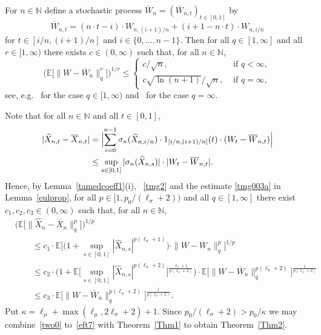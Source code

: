 \documentclass[11pt]{amsart}
\newcommand{\N}{{\mathbb N}}
\newcommand{\EE}{{\mathbb E}}
\newcommand{\eul}{{\widehat X}}
\newcommand{\ind}{1}
\theoremstyle{plain}
\theoremstyle{definition}
\begin{document}
For
$n\in\N$
define a stochastic process
$\overline W_n = (\overline W_{n,t})_{t\in[0,1]}$ by
\[
\overline W_{n,t} = (n\cdot t-i)\cdot W_{n,(i+1)/n} + (i+1-n\cdot t)\cdot  W_{n,i/n}
\]
for $t\in [i/n,(i+1)/n]$
and $i\in\{0,\ldots,n-1\}$.
Then for all  $q\in [1,\infty]$ and all $r\in [1,\infty)$
there exists $c\in (0,\infty)$ such that, for all $n\in\N$,
\begin{equation}\label{two01}
	\bigl(\EE\bigl[\|W-\overline W_n\|_q^r\bigr]\bigr)^{1/r}\leq \begin{cases}
		c/\sqrt n, & \text{ if }q < \infty,\\ c\sqrt{\ln (n+1)}/\sqrt{n}, & \text{ if }q = \infty,
	\end{cases}
\end{equation}
see, e.g.~\cite{Speckman79} for the case $q\in[1, \infty)$ and~\cite{Faure92} for the case $q=\infty$.

Note that for all $n\in\N$ and all $t\in[0,1]$,
\begin{align*}
	|\eul_{n,t} - \overline X_{n,t}| & =
	\Bigl|\sum_{i=0}^{n-1}\sigma_n(\eul_{n,i/n})\cdot \ind_{[i/n,(i+1)/n]}(t)\cdot (W_t- \overline W_{n,t})\Bigr|\\
	& \le \sup_{s\in[0,1]} |\sigma_n(\eul_{n,s})|\cdot |W_t-\overline W_{n,t}|.
\end{align*}
Hence, by Lemma~\ref{tamedcoeff1}(i), ~\eqref{tmg2} and the estimate \eqref{tmg003a} in Lemma~\ref{eulprop},  for all $p\in [1,p_0/(\ell_\sigma+2))$ and all $q\in [1,\infty]$  there exist $c_1,c_2,c_3\in (0,\infty)$ such that, for all $n\in\N$,
\begin{equation}\label{eft7}
\begin{aligned}
	&\bigl(\EE\bigl[\|\eul_n-\overline X_n\|_q^p\bigr]\bigr)^{1/p}\\
	 & \qquad\le c_1\cdot \EE\bigl[\bigl(1+\sup_{s\in[0,1]}|\eul_{n,s}|^{p(\ell_\sigma +1)}\bigr)\cdot \|W-\overline W_n\|_q^{p}\bigr]^{1/{p}}\\
		&\qquad\le c_2 \cdot \bigl(1 + \EE\bigl[\sup_{s\in[0,1]}|\eul_{n,s}|^{p(\ell_\sigma +2)}\bigr]^{\frac{\ell_\sigma+1}{p(\ell_\sigma+2)}}\bigr)\cdot \EE\bigl[ \|W-\overline W_n\|_q^{p(\ell_\sigma+2)} \bigr]^{\frac{1}{p(\ell_\sigma+2)}}\\
	&\qquad\le c_3\cdot \EE\bigl[ \|W-\overline W_n\|_q^{p(\ell_\sigma+2)} \bigr]^{\frac{1}{p(\ell_\sigma+2)}}.
\end{aligned}
\end{equation}
Put $\kappa = \ell_\mu+\max(\ell_\mu,2\ell_\sigma + 2)+1$. Since $p_0/(\ell_\sigma+2) > p_0/\kappa$ we may  combine~\eqref{two0} to~\eqref{eft7} with Theorem~\ref{Thm1} to obtain Theorem~\ref{Thm2}.













\end{document}
